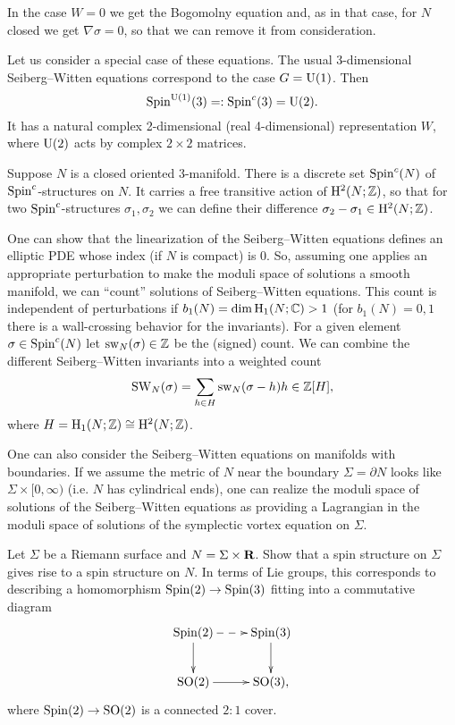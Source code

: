 In the case $W=0$ we get the Bogomolny equation and, as in that case, for $N$ closed we get $\nabla \sigma = 0$, so that we can remove it from consideration.

Let us consider a special case of these equations. The usual 3-dimensional Seiberg--Witten equations correspond to the case $G=\mathrm{U}(1)$. Then
\[\mathrm{Spin}^{\mathrm{U}(1)}(3) =: \mathrm{Spin}^c(3) = \mathrm{U}(2).\]
It has a natural complex 2-dimensional (real 4-dimensional) representation $W$, where $\mathrm{U}(2)$ acts by complex $2\times 2$ matrices.

Suppose $N$ is a closed oriented 3-manifold. There is a discrete set $\mathrm{Spin}^c(N)$ of $\mathrm{Spin}^c$-structures on $N$. It carries a free transitive action of $\mathrm{H}^2(N; \mathbb{Z})$, so that for two $\mathrm{Spin}^c$-structures $\sigma_1,\sigma_2$ we can define their difference $\sigma_2-\sigma_1\in\mathrm{H}^2(N; \mathbb{Z})$.

One can show that the linearization of the Seiberg--Witten equations defines an elliptic PDE whose index (if $N$ is compact) is 0. So, assuming one applies an appropriate perturbation to make the moduli space of solutions a smooth manifold, we can ``count'' solutions of Seiberg--Witten equations. This count is independent of perturbations if $b_1(N)=\dim \mathrm{H}_1(N;\mathbb{C})>1$ (for $b_1(N)=0,1$ there is a wall-crossing behavior for the invariants). For a given element $\sigma\in\mathrm{Spin}^c(N)$ let $\mathrm{sw}_N(\sigma)\in\mathbb{Z}$ be the (signed) count. We can combine the different Seiberg--Witten invariants into a weighted count
\[\mathrm{SW}_N(\sigma) = \sum_{h\in H} \mathrm{sw}_N(\sigma - h) h\in\mathbb{Z}[H],\]
where $H=\mathrm{H}_1(N;\mathbb{Z})\cong\mathrm{H}^2(N;\mathbb{Z})$.

\begin{remark}
One can also consider the Seiberg--Witten equations on manifolds with boundaries. If we assume the metric of $N$ near the boundary $\Sigma=\partial N$ looks like $\Sigma\times [0, \infty)$ (i.e. $N$ has cylindrical ends), one can realize the moduli space of solutions of the Seiberg--Witten equations as providing a Lagrangian in the moduli space of solutions of the symplectic vortex equation on $\Sigma$.
\end{remark}

\begin{exercise}
Let $\Sigma$ be a Riemann surface and $N=\Sigma\times \mathbf{R}$. Show that a spin structure on $\Sigma$ gives rise to a spin structure on $N$. In terms of Lie groups, this corresponds to describing a homomorphism $\mathrm{Spin}(2)\rightarrow \mathrm{Spin}(3)$ fitting into a commutative diagram
\[
\xymatrix{
\Spin(2) \ar@{-->}[r] \ar[d] & \Spin(3) \ar[d] \\
\SO(2) \ar[r] & \SO(3),
}
\]
where $\mathrm{Spin}(2)\rightarrow \mathrm{SO}(2)$ is a connected $2:1$ cover.
\end{exercise}

